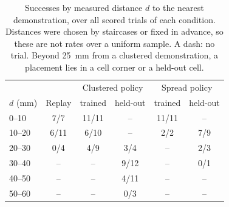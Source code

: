\begin{table}[t]
\caption{Successes by measured distance $d$ to the nearest demonstration, over all scored trials of each condition. Distances were chosen by staircases or fixed in advance, so these are not rates over a uniform sample. A dash: no trial. Beyond 25~mm from a clustered demonstration, a placement lies in a cell corner or a held-out cell.} %
\label{tab:bins}
\centering
\footnotesize
\setlength{\tabcolsep}{3pt}
\begin{tabular}{@{}lccccc@{}}
\toprule
 & & \multicolumn{2}{c}{Clustered policy} & \multicolumn{2}{c}{Spread policy} \\
$d$ (mm) & Replay & trained & held-out & trained & held-out \\
\midrule
0--10 & 7/7 & 11/11 & -- & 11/11 & -- \\ %
10--20 & 6/11 & 6/10 & -- & 2/2 & 7/9 \\ %
20--30 & 0/4 & 4/9 & 3/4 & -- & 2/3 \\ %
30--40 & -- & -- & 9/12 & -- & 0/1 \\ %
40--50 & -- & -- & 4/11 & -- & -- \\ %
50--60 & -- & -- & 0/3 & -- & -- \\ %
\bottomrule
\end{tabular}
\end{table}

